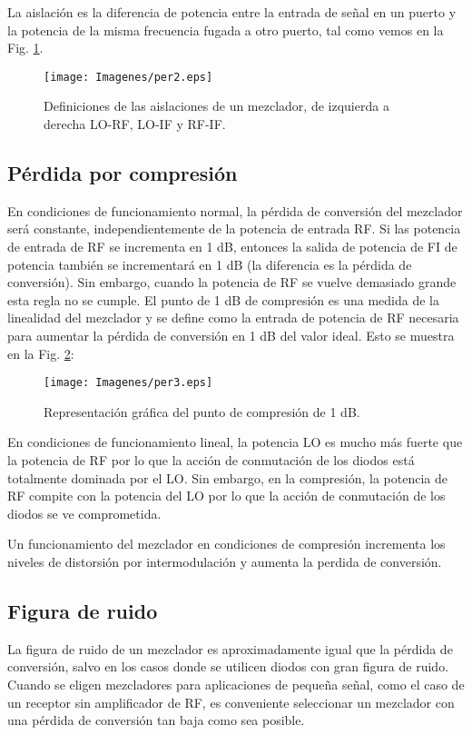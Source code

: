 \documentclass[conference]{IEEEtran}
\begin{document}
La  aislación  es  la  diferencia  de  potencia  entre  la  entrada  de  señal  en  un  puerto  y  la  potencia  de la misma frecuencia fugada a otro puerto, tal como vemos en la Fig. \ref{per2}.
			
			\begin{figure}[h!]
			\centering
			\texttt{[image: Imagenes/per2.eps]}
			\caption{Definiciones de las aislaciones de un mezclador, de izquierda a derecha LO-RF, LO-IF y RF-IF.}
			\label{per2}
			\end{figure}

\subsection{Pérdida por compresión}
En  condiciones  de  funcionamiento  normal,  la  pérdida  de  conversión  del  mezclador  será  constante, independientemente  de  la  potencia  de  entrada  RF.  Si  las  potencia  de  entrada  de  RF  se  incrementa  en  1  dB, entonces la salida de potencia de FI de potencia también se incrementará en 1 dB (la diferencia es la pérdida de conversión). Sin embargo,  cuando  la potencia de RF se vuelve demasiado grande esta regla no se cumple. El punto  de  1  dB  de  compresión  es  una  medida  de  la  linealidad  del  mezclador  y  se  define  como  la  entrada   de potencia de RF necesaria para aumentar la pérdida de conversión en 1 dB  del valor ideal. Esto se muestra en la Fig. \ref{per3}:
			
			\begin{figure}[h!]
			\centering
			\texttt{[image: Imagenes/per3.eps]}
			\caption{Representación gráfica del punto de compresión de 1 dB.}
			\label{per3}
			\end{figure}

En  condiciones de funcionamiento lineal, la potencia LO es mucho más fuerte   que la potencia de RF por lo que la acción de conmutación de  los  diodos  está  totalmente dominada  por el  LO.  Sin embargo, en la compresión, la potencia  de  RF  compite  con  la  potencia  del  LO  por  lo  que  la  acción  de  conmutación  de  los  diodos  se  ve 
comprometida.

Un  funcionamiento  del  mezclador  en  condiciones  de  compresión  incrementa  los  niveles  de  distorsión  por intermodulación y aumenta la perdida de conversión.

\subsection{Figura de ruido}
La figura de ruido de un mezclador es aproximadamente igual que la pérdida de conversión, salvo en los casos donde se utilicen diodos con gran figura de ruido. Cuando se eligen mezcladores para aplicaciones de pequeña señal, como el caso de un receptor sin amplificador de RF, es conveniente seleccionar un mezclador con una pérdida de conversión tan baja como sea posible.
			
\end{document}
